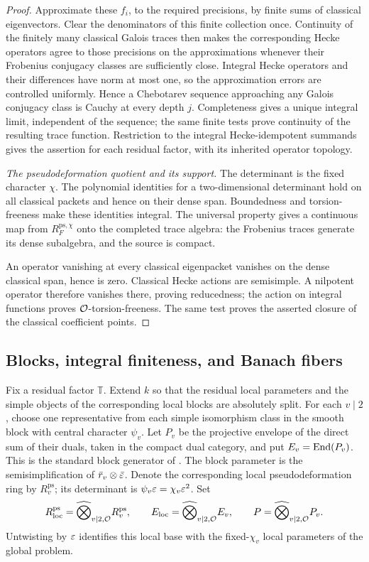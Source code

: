 \begin{proof}
Approximate these \(f_i\), to the required precisions,
by finite sums of classical eigenvectors. Clear the
denominators of this finite collection once. Continuity
of the finitely many classical Galois traces then makes
the corresponding Hecke operators agree to those
precisions on the approximations whenever their Frobenius conjugacy
classes are sufficiently close. Integral Hecke operators
and their differences have norm at most one, so the
approximation errors are controlled uniformly. Hence
a Chebotarev sequence approaching any Galois conjugacy
class is Cauchy at every depth \(j\). Completeness gives
a unique integral limit, independent of the sequence;
the same finite tests prove continuity of the resulting
trace function. Restriction to the integral Hecke-idempotent
summands gives the assertion for each residual factor,
with its inherited operator topology.

\emph{The pseudodeformation quotient and its support.}
The determinant is the fixed character \(\chi\).
The polynomial identities for a two-dimensional
determinant hold on all classical packets and hence
on their dense span. Boundedness and torsion-freeness
make these identities integral. The universal property
gives a continuous map from
\(R_F^{\mathrm{ps},\chi}\) onto the completed trace
algebra: the Frobenius traces generate its dense
subalgebra, and the source is compact.

An operator vanishing at every classical eigenpacket
vanishes on the dense classical span, hence is zero.
Classical Hecke actions are semisimple. A nilpotent
operator therefore vanishes there, proving reducedness;
the action on integral functions proves
\(\mathcal O\)-torsion-freeness. The same test proves the
asserted closure of the classical coefficient points.
\end{proof}

\subsection{Blocks, integral finiteness, and Banach fibers}

Fix a residual factor \(\mathbb T\). Extend \(k\) so that
the residual local parameters and the simple objects of
the corresponding local blocks are absolutely split.
For each \(v\mid2\), choose one representative from each simple
isomorphism class in the smooth block with central character
\(\psi_v\). Let \(P_v\) be the projective envelope of the direct
sum of their duals, taken in the compact dual category, and put
\(E_v=\operatorname{End}(P_v)\). This is the standard block generator of
\cite[Section~4.1]{PaskunasTung2021}.
The block parameter is the semisimplification of
\(\bar r_v\otimes\bar{\varepsilon}\).
Denote the corresponding local pseudodeformation ring
by \(R_v^{\mathrm{ps}}\); its determinant is
\(\psi_v\varepsilon=\chi_v\varepsilon^2\).
Set
\[
 R_{\mathrm{loc}}^{\mathrm{ps}}
   =\widehat\bigotimes_{v\mid2,\mathcal O} R_v^{\mathrm{ps}},
 \qquad
 E_{\mathrm{loc}}
   =\widehat\bigotimes_{v\mid2,\mathcal O} E_v,
 \qquad
 P=\widehat\bigotimes_{v\mid2,\mathcal O}P_v.
\]
Untwisting by \(\varepsilon\) identifies this local base with the
fixed-\(\chi_v\) local parameters of the global problem.

